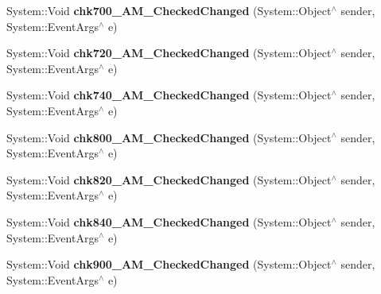 \begin{DoxyCompactItemize}
\item 
\mbox{\label{class_project1_1_1_my_form_a50937ce347d77d691214099078f2484d}} 
System\+::\+Void {\bfseries chk700\+\_\+A\+M\+\_\+\+Checked\+Changed} (System\+::\+Object$^\wedge$ sender, System\+::\+Event\+Args$^\wedge$ e)
\item 
\mbox{\label{class_project1_1_1_my_form_a98d64721ad0dcf3df730b828fa4a68bf}} 
System\+::\+Void {\bfseries chk720\+\_\+A\+M\+\_\+\+Checked\+Changed} (System\+::\+Object$^\wedge$ sender, System\+::\+Event\+Args$^\wedge$ e)
\item 
\mbox{\label{class_project1_1_1_my_form_a0d3263d4aac439a9b37e0604834cc9c8}} 
System\+::\+Void {\bfseries chk740\+\_\+A\+M\+\_\+\+Checked\+Changed} (System\+::\+Object$^\wedge$ sender, System\+::\+Event\+Args$^\wedge$ e)
\item 
\mbox{\label{class_project1_1_1_my_form_aaae69b7f6d16f067f4e92551510f15aa}} 
System\+::\+Void {\bfseries chk800\+\_\+A\+M\+\_\+\+Checked\+Changed} (System\+::\+Object$^\wedge$ sender, System\+::\+Event\+Args$^\wedge$ e)
\item 
\mbox{\label{class_project1_1_1_my_form_a3419a16874174a14a0761ef2564dc9aa}} 
System\+::\+Void {\bfseries chk820\+\_\+A\+M\+\_\+\+Checked\+Changed} (System\+::\+Object$^\wedge$ sender, System\+::\+Event\+Args$^\wedge$ e)
\item 
\mbox{\label{class_project1_1_1_my_form_ac9795e69a1465e96b046fb0d10706c7d}} 
System\+::\+Void {\bfseries chk840\+\_\+A\+M\+\_\+\+Checked\+Changed} (System\+::\+Object$^\wedge$ sender, System\+::\+Event\+Args$^\wedge$ e)
\item 
\mbox{\label{class_project1_1_1_my_form_a0381bbfce4f03b257f2d54c609a14a34}} 
System\+::\+Void {\bfseries chk900\+\_\+A\+M\+\_\+\+Checked\+Changed} (System\+::\+Object$^\wedge$ sender, System\+::\+Event\+Args$^\wedge$ e)
\item 
\mbox{\label{class_project1_1_1_my_form_a8eec244a9bfe0ad25de8fc2dbab5a0e1}} 

\end{DoxyCompactItemize}
